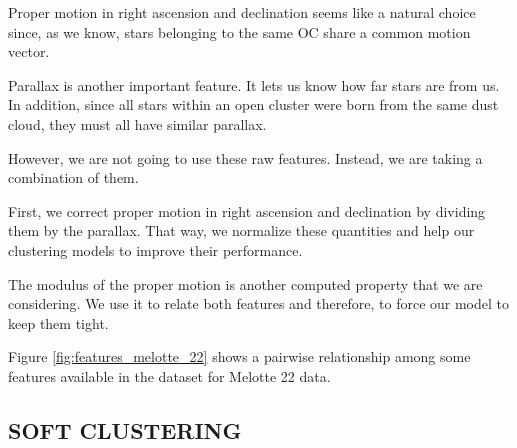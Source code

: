 \documentclass[11pt,a4paper,USenglish,twocolumn]{article}
\begin{document}
Proper motion in right ascension and declination seems like a natural choice since,
as we know, stars belonging to the same OC share a common motion vector.

Parallax is another important feature. It lets us know how far stars are from us.
In addition, since all stars within an open cluster were born from the same dust cloud,
they must all have similar parallax.

However, we are not going to use these raw features.
Instead, we are taking a combination of them.

First, we correct proper motion in right ascension and declination by dividing them by
the parallax. That way, we normalize these quantities and help our clustering models
to improve their performance.

The modulus of the proper motion is another computed property that we are considering.
We use it to relate both features and therefore, to force our model to keep them tight.

Figure \ref{fig:features_melotte_22} shows a pairwise relationship among some features
available in the dataset for Melotte 22 data.

\subsection{SOFT CLUSTERING}
\end{document}
